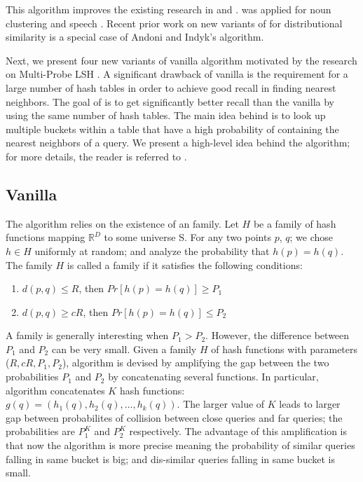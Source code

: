 This algorithm improves the existing research in \lsh and \plebf \cite{Indyk98STOC,Charikar02STOC}. 
\plebf was applied for noun clustering \cite{ravichandran05} and speech \cite {JansenASRU11,JansenIS12}. 
Recent prior work on new variants of \plebf  \cite{goyal12Flag} for distributional similarity is a special case of Andoni and Indyk's \lsh algorithm. 

Next, we present four new variants of vanilla \lsh algorithm motivated by the research on Multi-Probe LSH \cite{LvVLDB07}. 
A significant drawback of vanilla \lsh is the requirement for a large number of hash tables in order to achieve good recall 
in finding nearest neighbors. 
The goal of  \mblshf is to get significantly better recall than the vanilla \lsh by using 
the same number of hash tables. The main idea behind \mblshf is to look up multiple buckets within a table that have a high probability 
of containing the nearest neighbors of a query. We present a high-level idea behind the \mblshf algorithm; 
for more details, the reader is referred to \cite{LvVLDB07}.


\subsection{Vanilla \lsh}
\label{sec:vlsh}
The \lsh algorithm relies on the existence of an \lsh family. Let $H$ be a family of hash functions mapping 
 $\mathbb{R}^D$ to some universe S. For any two points $p$, $q$; we chose $h\in H$ uniformly at random; 
 and analyze the probability that $h(p) = h(q)$.  The family $H$ is called a \lsh family if 
 it satisfies the following conditions:

\begin{enumerate}
\item $d(p,q) \leq R$, then $Pr[h(p)=h(q)] \geq P_1$ 
\item $d(p,q) \geq cR$, then $Pr[h(p)=h(q)] \leq P_2$
\end{enumerate}

A family is generally interesting when  $P_1>P_2$. 
However, the difference between $P_1$ and $P_2$ can be very small. 
Given a family $H$ of hash functions with parameters ($R, cR, P_1,P_2$), 
\lsh algorithm is devised by amplifying the gap between 
the two probabilities $P_1$ and $P_2$ by concatenating several functions. 
In particular, \lsh algorithm concatenates $K$ hash functions: 
$g(q)=(h_1(q),h_2(q),\dots,h_k(q))$. The larger value of $K$ leads to larger 
gap between probabilites of collision between close queries and far queries; 
the probabilities are $P_1^{K}$ and $P_2^{K}$ respectively. 
The advantage of this amplification is that now the algorithm is more precise meaning 
the probability of similar queries falling in same bucket is big; 
and dis-similar queries falling in same bucket is small.  

